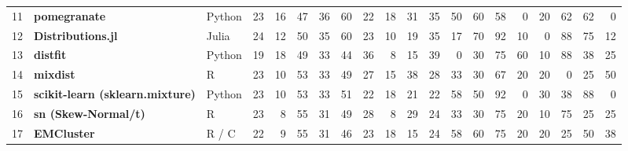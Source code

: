 \documentclass[10pt,a4paper]{article}
\begin{document}
\begin{landscape}
{\begin{longtable}{@{}r l l r r r r r r r *{10}{r}@{}}
11 & \textbf{pomegranate} & Python & 23 & 16 & 47 & \cellcolor{hm!30}36 & \cellcolor{hm!47}60 & \cellcolor{hm!20}22 & \cellcolor{hm!17}18 & \cellcolor{hm!27}31 & \cellcolor{hm!29}35 & \cellcolor{hm!40}50 & \cellcolor{hm!47}60 & \cellcolor{hm!46}58 & \cellcolor{hm!5}0 & \cellcolor{hm!19}20 & \cellcolor{hm!49}62 & \cellcolor{hm!49}62 & \cellcolor{hm!5}0 \\
12 & \textbf{Distributions.jl} & Julia & 24 & 12 & 50 & \cellcolor{hm!29}35 & \cellcolor{hm!47}60 & \cellcolor{hm!21}23 & \cellcolor{hm!12}10 & \cellcolor{hm!18}19 & \cellcolor{hm!29}35 & \cellcolor{hm!17}17 & \cellcolor{hm!54}70 & \cellcolor{hm!69}92 & \cellcolor{hm!12}10 & \cellcolor{hm!5}0 & \cellcolor{hm!66}88 & \cellcolor{hm!58}75 & \cellcolor{hm!14}12 \\
13 & \textbf{distfit} & Python & 19 & 18 & 49 & \cellcolor{hm!28}33 & \cellcolor{hm!36}44 & \cellcolor{hm!30}36 & \cellcolor{hm!10}8 & \cellcolor{hm!15}15 & \cellcolor{hm!32}39 & \cellcolor{hm!5}0 & \cellcolor{hm!26}30 & \cellcolor{hm!58}75 & \cellcolor{hm!47}60 & \cellcolor{hm!12}10 & \cellcolor{hm!66}88 & \cellcolor{hm!31}38 & \cellcolor{hm!22}25 \\
14 & \textbf{mixdist} & R & 23 & 10 & 53 & \cellcolor{hm!28}33 & \cellcolor{hm!39}49 & \cellcolor{hm!24}27 & \cellcolor{hm!16}15 & \cellcolor{hm!31}38 & \cellcolor{hm!25}28 & \cellcolor{hm!28}33 & \cellcolor{hm!26}30 & \cellcolor{hm!52}67 & \cellcolor{hm!19}20 & \cellcolor{hm!19}20 & \cellcolor{hm!5}0 & \cellcolor{hm!22}25 & \cellcolor{hm!40}50 \\
15 & \textbf{scikit-learn (sklearn.mixture)} & Python & 23 & 10 & 53 & \cellcolor{hm!28}33 & \cellcolor{hm!41}51 & \cellcolor{hm!20}22 & \cellcolor{hm!17}18 & \cellcolor{hm!20}21 & \cellcolor{hm!20}22 & \cellcolor{hm!46}58 & \cellcolor{hm!40}50 & \cellcolor{hm!69}92 & \cellcolor{hm!5}0 & \cellcolor{hm!26}30 & \cellcolor{hm!31}38 & \cellcolor{hm!66}88 & \cellcolor{hm!5}0 \\
16 & \textbf{sn (Skew-Normal/t)} & R & 23 & 8 & 55 & \cellcolor{hm!27}31 & \cellcolor{hm!39}49 & \cellcolor{hm!25}28 & \cellcolor{hm!10}8 & \cellcolor{hm!25}29 & \cellcolor{hm!22}24 & \cellcolor{hm!28}33 & \cellcolor{hm!26}30 & \cellcolor{hm!58}75 & \cellcolor{hm!19}20 & \cellcolor{hm!12}10 & \cellcolor{hm!58}75 & \cellcolor{hm!22}25 & \cellcolor{hm!22}25 \\
17 & \textbf{EMCluster} & R / C & 22 & 9 & 55 & \cellcolor{hm!27}31 & \cellcolor{hm!37}46 & \cellcolor{hm!21}23 & \cellcolor{hm!17}18 & \cellcolor{hm!15}15 & \cellcolor{hm!22}24 & \cellcolor{hm!46}58 & \cellcolor{hm!47}60 & \cellcolor{hm!58}75 & \cellcolor{hm!19}20 & \cellcolor{hm!19}20 & \cellcolor{hm!22}25 & \cellcolor{hm!40}50 & \cellcolor{hm!31}38 \\

\end{longtable}}
\end{landscape}
\end{document}
